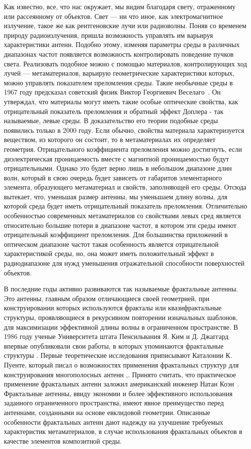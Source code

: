 Как известно, все, что нас окружает, мы видим благодаря свету, отраженному или рассеянному от объектов. Свет --- ни что иное, как электромагнитное излучение, такое же как рентгеновские лучи или радиоволны. Поняв со временем природу радиоизлучения, пришла возможность управлять им варьируя характеристики антенн. Подобно этому, изменяя параметры среды в различных диапазонах частот появляется возможность контролировать поведение пучков света. Реализовать подобное можно с помощью материалов, контролирующих ход лучей --- метаматериалов, варьирую геометрические характеристики которых, можно управлять показателем преломления среды. 
Такие необычные среды в 1967 году предсказал советский физик Виктор Георгиевич Веселаго~\cite{b11}. Он утверждал, что материалы могут иметь такие особые оптические свойства, как отрицательный показатель преломления и обратный эффект Доплера - так называемые, левые среды. В доказательство его теории подобные среды появились только в 2000 году. Если обычно, свойства материала характеризуется веществом, из которого он состоит, то в метаматериалах их определяет геометрия. Отрицательного коэффициента преломления можно достигнуть, если диэлектрическая проницаемость вместе с магнитной проницаемостью будут отрицательными. Однако это будет верно лишь в небольшом диапазоне длин волн, который в свою очередь будет зависеть от габаритов элементарного элемента, образующего метаматериал и свойств, заполняющей его среды. Отсюда вытекает, что, уменьшая размер антенны, мы уменьшаем длину волны, для которой среда будет иметь отрицательный показатель преломления. Отличительно особенностью современных метаматериалов со свойствами левых сред является относительно большие потери в диапазоне частот, в котором эти среды имеют отрицательный коэффициент преломления. Для большинства приложений в оптическом диапазоне частот такая особенность является отрицательной характеристикой среды, но, она может иметь положительный эффект в радиодиапазоне для нужд уменьшения отражательной способности поверхностей объектов.

В последние годы активно развиваются так называемые фрактальные антенны. Это антенны, главным образом отличающиеся своей геометрией, при конструировании которых используются фракталы или квазифрактальные структуры, проявляющиеся в рекурсивном повторении изначальных шаблонов, для максимизации эффективной длины волны в ограниченном пространстве. В 1986 году ученые Университета штата Пенсильвания Я. Ким и Д. Джаггард впервые опубликовали свои работы, в которых упоминаются фрактальные структуры \cite{b1}. Первые теоретические исследования приписывают Каталонии К. Пуенте, который писал о возможностях применения фрактальных структур для конструирования многополосных антенн \cite{b8},\cite{b9}. Принято считать, что практическое применение фрактальных антенн заложил американский инженер Натан Коэн~\cite{b10}. Фрактальные антенны, ввиду экономии и более эффективного использования заданного ограниченного пространства, имеют явное преимущество перед антеннами, созданными на основе евклидовой геометрии. Описанные особенности фрактальных антенн дают надежду на улучшение требуемых характеристик метаматериалов, в случае использования фрактальных объектов в качестве элементов композитной среды.


